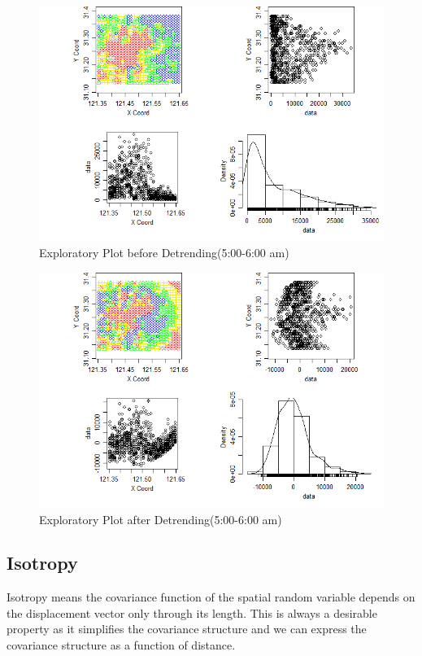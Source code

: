 \documentclass[hidelinks,12pt]{article}
\begin{document}
	
	\begin{figure}[!ht]
		\includegraphics[width=\textwidth]{geo5.png}
		\caption{Exploratory Plot before Detrending(5:00-6:00 am) \label{fig:geo5}}
	\end{figure}
	\FloatBarrier
	
	\begin{figure}[!ht]
		\includegraphics[width=\textwidth]{gres5.png}
		\caption{Exploratory Plot after Detrending(5:00-6:00 am)\label{fig:gres5}}
	\end{figure}
	\FloatBarrier
	
	
	
	\subsection{Isotropy}\label{sec:anis}
	Isotropy means the covariance function of the spatial random variable depends on the displacement vector only through its length. This is always a desirable property as it simplifies the covariance structure and we can express the covariance structure as a function of distance.
	
\end{document}
